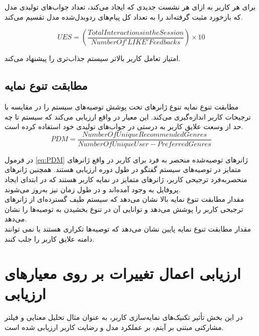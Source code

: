 برای هر کاربر به ازای هر نشست جدیدی که ایجاد می‌کند، تعداد جواب‌های تولیدی مدل که بازخورد مثبت گرفته‌اند را به تعداد کل پیام‌های ردو‌بدل‌شده مدل تقسیم می‌کند.

\begin{flushright}
\begin{equation}
UES = \left( \frac{Total Interactions in the Session}{Number Of 'LIKE' Feedbacks} \right) \times 10
\end{equation}
\end{flushright}

امتیاز تعامل کاربر بالاتر سیستم جذاب‌تری را پیشنهاد می‌کند.

\subsection[مطابقت تنوع نمایه]{مطابقت تنوع نمایه}

مطابقت تنوع نمایه تنوع ژانرهای تحت پوشش توصیه‌های سیستم را در مقایسه با ترجیحات کاربر اندازه‌گیری می‌کند. این معیار در واقع ارزیابی می‌کند که سیستم تا چه حد از وسعت علایق کاربر به درستی در جواب‌های تولیدی خود استفاده کرده است.
\begin{equation}
PDM = \frac{Number Of Unique Recommended Genres}{Number Of Unique User-Preferred Genres}
\label{eq:PDM}
\end{equation}
   

 در فرمول 
\ref{eq:PDM}
ژانرهای توصیه‌شده منحصر به فرد برای کاربر در واقع  ژانرهای متمایز در توصیه‌های سیستم گفتگو در طول دوره ارزیابی هستند. همچنین ژانرهای منحصربه‌فرد ترجیحی کاربر، ژانرهای متمایز در نمایه کاربر هستند که در ابتدای ایجاد پروفایل به وجود آمده‌اند و در طول زمان نیز به‌روز می‌شوند.\\


مقدار مطابقت تنوع نمایه بالا نشان می‌دهد که سیستم طیف گسترده‌ای از ژانرهای ترجیحی کاربر را پوشش می‌دهد و توانایی آن در تنوع بخشیدن به توصیه‌ها را نشان می‌دهد.
\\
مقدار مطابقت تنوع نمایه پایین نشان می‌دهد که توصیه‌ها تکراری هستند یا نمی توانند دامنه علایق کاربر را جلب کنند.

\section{ارزیابی اعمال تغییرات بر روی معیارهای ارزیابی}

در این بخش تأثیر تکنیک‌های نمایه‌سازی کاربر، به عنوان مثال تحلیل معنایی و فیلتر مشارکتی مبتنی بر آیتم، بر عملکرد مدل و رضایت کاربر ارزیابی شده است.

